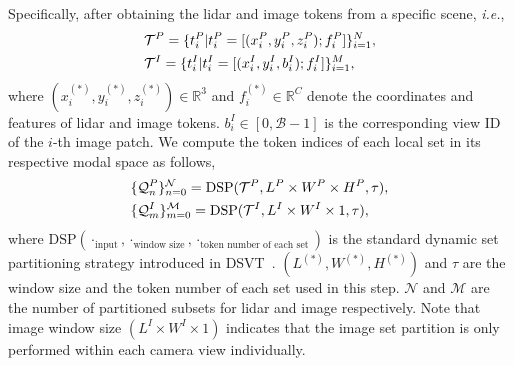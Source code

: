 \documentclass[10pt,twocolumn,letterpaper]{article}
\begin{document}
Specifically, after obtaining the lidar and image tokens from a specific scene, \textit{i.e.},
\vspace{-3pt}
\begin{equation}
  \begin{aligned}
  & \mathcal{T}^P  = \{ t_i^P | t_i^P= [(x_i^P, y_i^P, z_i^P); f_i^P] \}^N_{i=1}, \\
  & \mathcal{T}^I  = \{ t_i^I | t_i^I= [(x_i^I, y_i^I, b_i^I); f_i^I] \}^M_{i=1},
  \end{aligned}
  \vspace{-3pt}
\end{equation}
where $(x_i^{(*)}, y_i^{(*)}, z_i^{(*)}) \in \mathbb{R}^3$ and $f_i^{(*)} \in \mathbb{R}^C$ denote the coordinates and features of lidar and image tokens. $b_i^I \in [0, \mathcal{B}-1]$  is the corresponding view ID of the $i$-th image patch. We compute the token indices of each local set in its respective modal space as follows,
\vspace{-3pt}
\begin{equation}
  \begin{aligned}
  & \{\mathcal{Q}^P_n\}_{n=0}^{\mathcal{N}}  = \text{DSP}(\mathcal{T}^P, L^P \times W^P \times H^P, \tau), \\
  & \{\mathcal{Q}^I_m\}_{m=0}^{\mathcal{M}}  = \text{DSP}(\mathcal{T}^I, L^I \times W^I \times 1, \tau), 
  \end{aligned}
  \vspace{-3pt}
\end{equation}
where $\text{DSP}(\cdot _{\text{input}}, \cdot _{\text{window size}}, \cdot _{\text{token number of each set}})$ is the standard dynamic set partitioning strategy introduced in DSVT~\cite{wang2023dsvt}. $(L^{(*)}, W^{(*)}, H^{(*)})$ and $\tau$ are the window size and the token number of each set used in this step. $\mathcal{N}$ and $\mathcal{M}$ are the number of partitioned subsets for lidar and image respectively. Note that image window size $(L^I \times W^I \times 1)$ indicates that the image set partition is only performed within each camera view individually.
\end{document}

